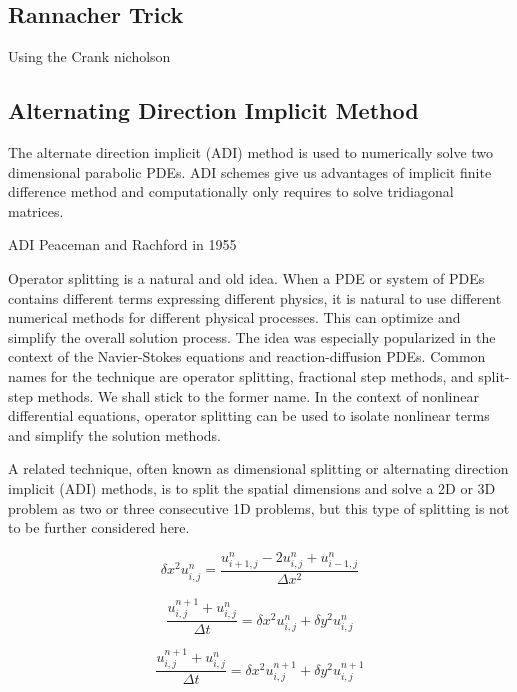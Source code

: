 \documentclass[12pt, oneside]{book}
\theoremstyle{plain}
\theoremstyle{definition}
\begin{document}
\subsection{Rannacher Trick}
Using the Crank nicholson 



\subsection{Alternating Direction Implicit Method}
The alternate direction implicit (ADI) method is used to numerically solve two dimensional parabolic PDEs. ADI schemes give us advantages of implicit finite difference method and computationally only requires to solve tridiagonal matrices.

ADI Peaceman and Rachford in 1955 \cite{peace}

Operator splitting is a natural and old idea. When a PDE or system of PDEs contains different terms expressing different physics, it is natural to use different numerical methods for different physical processes. This can optimize and simplify the overall solution process. The idea was especially popularized in the context of the Navier-Stokes equations and reaction-diffusion PDEs. Common names for the technique are operator splitting, fractional step methods, and split-step methods. We shall stick to the former name. In the context of nonlinear differential equations, operator splitting can be used to isolate nonlinear terms and simplify the solution methods.

A related technique, often known as dimensional splitting or alternating direction implicit (ADI) methods, is to split the spatial dimensions and solve a 2D or 3D problem as two or three consecutive 1D problems, but this type of splitting is not to be further considered here.


\begin{equation}
\delta x^2 u^{n}_{i,j}  = \frac{u^{n}_{i+1,j} - 2u^{n}_{i,j} + u^{n}_{i-1,j}}{\Delta x^2}
\end{equation}

\begin{equation}
\frac{u^{n+1}_{i,j} + u^{n}_{i,j}}{\Delta t} = \delta x^2 u^{n}_{i,j} + \delta y^2 u^{n}_{i,j}
\end{equation}

\begin{equation}
\frac{u^{n+1}_{i,j} + u^{n}_{i,j}}{\Delta t} = \delta x^2 u^{n+1}_{i,j} + \delta y^2 u^{n+1}_{i,j}
\end{equation}
\end{document}
